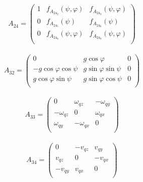 \begin{equation}
A_{24}=\left(\begin{array}{ccc}
1 & f_{A_{24_2}}(\psi,\varphi) & f_{A_{24_3}}(\psi,\varphi) \\
0 & f_{A_{24_5}}(\psi) & f_{A_{24_6}}(\psi) \\
0&f_{A_{24_8}}(\psi,\varphi)&f_{A_{24_9}}(\psi,\varphi)\\
\end{array}\right)
\end{equation}\\

\begin{equation}
A_{32}=\left(\begin{array}{ccc}
0 & g\cos \varphi & 0 \\
-g\cos \varphi \cos \psi & g\sin\varphi\sin\psi & 0 \\
 g\cos \varphi \sin \psi & g\sin\varphi\cos\psi & 0 \\
\end{array}\right)
\end{equation}\\

\begin{equation}
A_{33}=\left(\begin{array}{ccc}
0 & \omega_{qz} & -\omega_{qy} \\
-\omega_{qz} & 0 &\omega_{qx} \\
\omega_{qy} & -\omega_{qx}& 0 \\
\end{array}\right)
\end{equation}\\

\begin{equation}
A_{34}=\left(\begin{array}{ccc}
0 & -v_{qz} & v_{qy} \\
v_{qz} & 0 &-v_{qx} \\
-v_{qy} & v_{qx}& 0 \\
\end{array}\right)
\end{equation}\\

